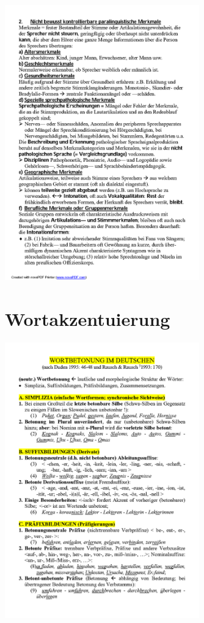 \documentclass[
  letterpaper,
]{scrbook}
\begin{document}
\includegraphics[width=3.31in,height=\textheight]{./pictures/prosodie/06_Prosodie_Folie_2005-06_R_Page17.png}

\hypertarget{wortakzentuierung}{%
\section{Wortakzentuierung}\label{wortakzentuierung}}

\includegraphics[width=3.31in,height=\textheight]{./pictures/05b_Wortbetonung_Page1.png}
\end{document}
